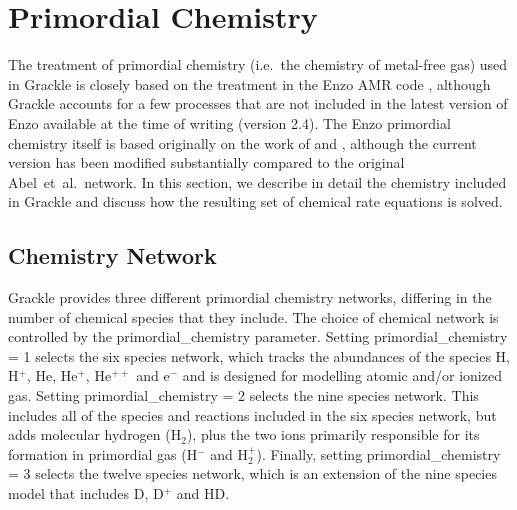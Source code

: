 


\section{Primordial Chemistry} \label{sec:primordial_chemistry}
The treatment of primordial chemistry (i.e.\ the chemistry of metal-free gas) used in Grackle is closely based on the
treatment in the Enzo AMR code \citep{2014ApJS..211...19B}, although Grackle accounts for a few processes that are not included 
in the latest version of Enzo available at the time of writing (version 2.4). The Enzo primordial chemistry itself is based 
originally on the work of \citet{1997NewA....2..181A} and \citet{1997NewA....2..209A}, although the current version has been
modified substantially compared to the original Abel~et~al.\ network. In this section, we describe in detail the chemistry 
included in Grackle and discuss how the resulting set of chemical rate equations is solved. 

\subsection{Chemistry Network} \label{sec:network}
Grackle provides three different primordial chemistry networks, differing in the number of chemical species that they include. 
The choice of chemical network is controlled by the primordial\_chemistry parameter. Setting primordial\_chemistry = 1 selects the
six species network, which tracks the abundances of the species H, H$^{+}$, He, He$^{+}$, He$^{++}$ and e$^{-}$ and is 
designed for modelling atomic and/or ionized gas. Setting primordial\_chemistry = 2 selects the nine species network. This
includes all of the species and reactions included in the six species network, but adds molecular hydrogen (H$_2$), plus the
two ions primarily responsible for its formation in primordial gas (H$^{-}$ and H$_{2}^{+}$). Finally, setting primordial\_chemistry = 3
selects the twelve species network, which is an extension of the nine species model that includes D, D$^{+}$ and HD.


